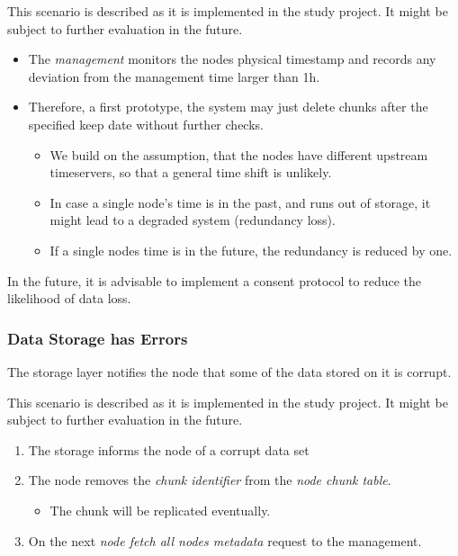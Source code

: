 This scenario is described as it is implemented in the study project. It might be subject to further evaluation in the future.

\begin{itemize}
    \item The \emph{management} monitors the nodes physical timestamp and records any deviation from the management time larger than 1h.
    \item Therefore, a first prototype, the system may just delete chunks after the specified keep date without further checks.
        \begin{itemize}
            \item We build on the assumption, that the nodes have different upstream timeservers, so that a general time shift is unlikely.
            \item In case a single node's time is in the past, and runs out of storage, it might lead to a degraded system (redundancy loss).
            \item If a single nodes time is in the future, the redundancy is reduced by one.
        \end{itemize}
\end{itemize}

In the future, it is advisable to implement a consent protocol to reduce the likelihood of data loss.

\subsubsection{Data Storage has Errors}\label{sec:scenario-storage-errors}
The storage layer notifies the node that some of the data stored on it is corrupt.

This scenario is described as it is implemented in the study project. It might be subject to further evaluation in the future.

\begin{enumerate}
    \item The storage informs the node of a corrupt data set
    \item The node removes the \emph{chunk identifier} from the \emph{node chunk table}.
        \begin{itemize}
            \item The chunk will be replicated eventually.
        \end{itemize}
    \item On the next \emph{node fetch all nodes metadata} request to the management.
\end{enumerate}

